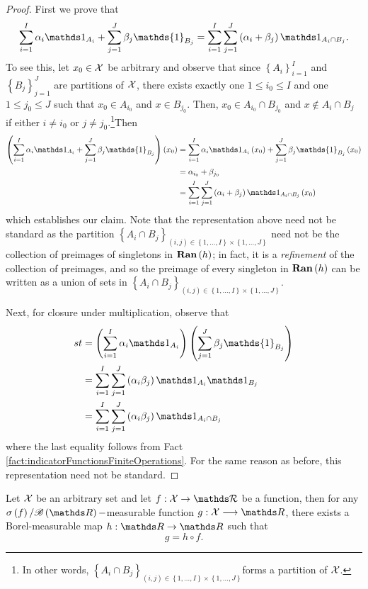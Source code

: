 \begin{proof}
First we prove that 
\[
\sum_{i=1}^{I}\alpha_{i}\indicate_{A_{i}}+\sum_{j=1}^{J}\beta_{j}\mathds{1}_{B_{j}}=\sum_{i=1}^{I}\sum_{j=1}^{J}\left(\alpha_{i}+\beta_{j}\right)\indicate_{A_{i}\cap B_{j}}.
\]
To see this, let $x_{0}\in\mathcal{X}$ be arbitrary and observe that since
$\left\{ A_{i}\right\} _{i=1}^{I}$ and $\left\{ B_{j}\right\} _{j=1}^{J}$
are partitions of $\mathcal{X}$, there exists exactly one $1\leq i_{0}\leq I$
and one $1\leq j_{0}\leq J$ such that $x_{0}\in A_{i_{0}}$ and $x\in B_{j_{0}}$.
Then, $x_{0}\in A_{i_{0}}\cap B_{j_{0}}$ and $x\notin A_{i}\cap B_{j}$
if either $i\neq i_{0}$ or $j\neq j_{0}$.\footnote{In other words, $\left\{ A_{i}\cap B_{j}\right\} _{\left(i,j\right)\in\left\{ 1,\ldots,I\right\} \times\left\{ 1,\ldots,J\right\} }$forms
a partition of $\mathcal{X}$.}Then 
\begin{align*}
\left(\sum_{i=1}^{I}\alpha_{i}\indicate_{A_{i}}+\sum_{j=1}^{J}\beta_{j}\mathds{1}_{B_{j}}\right)\left(x_{0}\right) & =\sum_{i=1}^{I}\alpha_{i}\indicate_{A_{i}}\left(x_{0}\right)+\sum_{j=1}^{J}\beta_{j}\mathds{1}_{B_{j}}\left(x_{0}\right)\\
 & =\alpha_{i_{0}}+\beta_{j_{0}}\\
 & =\sum_{i=1}^{I}\sum_{j=1}^{J}\left(\alpha_{i}+\beta_{j}\right)\indicate_{A_{i}\cap B_{j}}\left(x_{0}\right)
\end{align*}
which establishes our claim. Note that the representation above need
not be standard as the partition $\left\{ A_{i}\cap B_{j}\right\} _{\left(i,j\right)\in\left\{ 1,\ldots,I\right\} \times\left\{ 1,\ldots,J\right\} }$
need not be the collection of preimages of singletons in $\operatorname{\mathbf{Ran}}\left(h\right)$;
in fact, it is a \emph{refinement }of the collection of preimages,
and so the preimage of every singleton in $\operatorname{\mathbf{Ran}}\left(h\right)$ can
be written as a union of sets in $\left\{ A_{i}\cap B_{j}\right\} _{\left(i,j\right)\in\left\{ 1,\ldots,I\right\} \times\left\{ 1,\ldots,J\right\} }$.

Next, for closure under multiplication, observe that
\begin{align*}
st & =\left(\sum_{i=1}^{I}\alpha_{i}\indicate_{A_{i}}\right)\left(\sum_{j=1}^{J}\beta_{j}\mathds{1}_{B_{j}}\right)\\
 & =\sum_{i=1}^{I}\sum_{j=1}^{J}\left(\alpha_{i}\beta_{j}\right)\indicate_{A_{i}}\indicate_{B_{j}}\\
 & =\sum_{i=1}^{I}\sum_{j=1}^{J}\left(\alpha_{i}\beta_{j}\right)\indicate_{A_{i}\cap B_{j}}
\end{align*}
where the last equality follows from Fact \ref{fact:indicatorFunctionsFiniteOperations}.
For the same reason as before, this representation need not be standard.
\end{proof}
\begin{prop}
\label{prop:doobDynkin}Let $\mathcal{X}$ be an arbitrary set and let $f:\X\to\mathcal{\R}$
be a function, then for any $\sigma\left(f\right)/\mathcal{\borel}\left(\R\right)-$measurable
function $g:\X\longrightarrow\R$, there exists a Borel-measurable
map $h:\R\to\R$ such that
\[
g=h\circ f.
\]
\end{prop}

